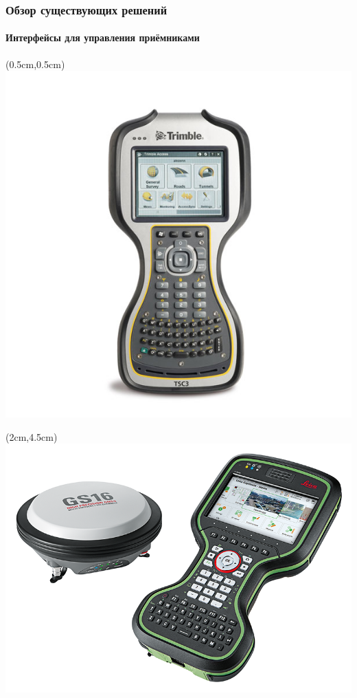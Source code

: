 \documentclass[xetex,t]{beamer}
\begin{document}
%
%
\begin{frame}
  \frametitle{Обзор существующих решений}
  \framesubtitle{Интерфейсы для управления приёмниками}

  \begin{textblock*}{3cm}(0.5cm,0.5cm)
    \includegraphics[width=\textwidth]{../img/trimble-tsc3}
  \end{textblock*}
  \begin{textblock*}{3cm}(2cm,4.5cm)
    \includegraphics[width=\textwidth]{../img/leica-gs16}

\end{textblock*}
\end{frame}
\end{document}
